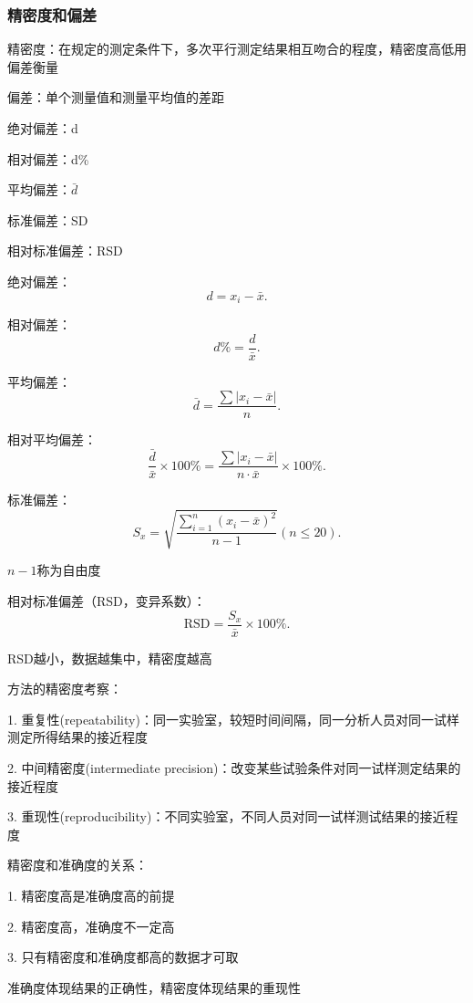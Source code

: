 \subsubsection{精密度和偏差}%
\label{subsub:精密度和偏差}
\begin{defi}
    精密度：在规定的测定条件下，多次平行测定结果相互吻合的程度，精密度高低用偏差衡量

    偏差：单个测量值和测量平均值的差距
\end{defi}
\begin{defi}
    绝对偏差：d

    相对偏差：d\%

    平均偏差：$\bar{d}$

    标准偏差：SD

    相对标准偏差：RSD
\end{defi}

绝对偏差：\[
    d=x_i-\bar{x}
.\]

相对偏差：\[
    d\%=\frac{d}{\bar{x}}
.\]

平均偏差：\[
    \bar{d}=\frac{\sum |x_{i}-\bar{x}|}{n}
.\]

相对平均偏差：\[
    \frac{\bar{d}}{\bar{x}}\times 100\%=\frac{\sum |x_{i}-\bar{x}|}{n\cdot \bar{x}}\times 100\%
.\]

标准偏差：\[
    S_x=\sqrt{\frac{\displaystyle{\sum_{i=1}^{n} \left( x_{i}-\bar{x} \right) ^2}}{n-1}} \left(n\le 20  \right) 
.\] 

$n-1 $称为自由度

相对标准偏差（RSD，变异系数）：\[
    \text{RSD}=\frac{S_x}{\bar{x}}\times 100\%
.\] 

RSD越小，数据越集中，精密度越高

\begin{notation}
    方法的精密度考察：

    1. 重复性(repeatability)：同一实验室，较短时间间隔，同一分析人员对同一试样测定所得结果的接近程度

    2. 中间精密度(intermediate precision)：改变某些试验条件对同一试样测定结果的接近程度

    3. 重现性(reproducibility)：不同实验室，不同人员对同一试样测试结果的接近程度
\end{notation}

\begin{notation}
    精密度和准确度的关系：

    1. 精密度高是准确度高的前提

    2. 精密度高，准确度不一定高

    3. 只有精密度和准确度都高的数据才可取
\end{notation}
\begin{notation}
    准确度体现结果的正确性，精密度体现结果的重现性
\end{notation}

